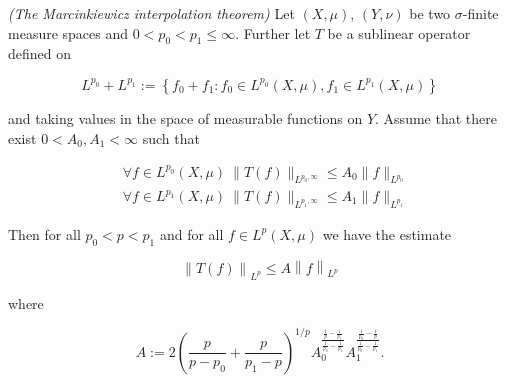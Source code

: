 \begin{mdframed}
	\begin{theorem}\emph{(The Marcinkiewicz interpolation theorem)}
		Let $(X,\mu)$, $(Y,\nu)$ be two $\sigma$-finite measure spaces and $0 < p_0 < p_1 \leq \infty$. Further let $T$ be a sublinear operator defined on
		
		\begin{equation*}
			L^{p_0} + L^{p_1} := \left\{ f_0 + f_1 : f_0 \in L^{p_0}(X,\mu), f_1 \in L^{p_1}(X,\mu) \right\}
		\end{equation*}
		
		\noindent and taking values in the space of measurable functions on $Y$. Assume that there exist $0 < A_0,A_1 < \infty$ such that

		\begin{align}
			&\forall f \in L^{p_0}(X,\mu)~\|T(f)\|_{L^{p_0,\infty}} \leq A_0 \|f\|_{L^{p_0}}\label{hyp:fp_0}\\
			&\forall f \in L^{p_1}(X,\mu)~\|T(f)\|_{L^{p_1,\infty}} \leq A_1 \|f\|_{L^{p_1}}\label{hyp:fp_1}
		\end{align}

		Then for all $p_0 < p < p_1$ and for all $f \in L^p(X,\mu)$ we have the estimate

		\begin{equation}
			\left\|T(f)\right\|_{L^p} \leq A \left\|f\right\|_{L^p}
		\end{equation}

		\noindent where

		\begin{equation}
			A := 2\left( \frac{p}{p - p_0} + \frac{p}{p_1 - p} \right)^{1/p}A_0^{\frac{\frac{1}{p} - \frac{1}{p_1}}{\frac{1}{p_0}-\frac{1}{p_1}}}A_1^{\frac{\frac{1}{p_0}-\frac{1}{p}}{\frac{1}{p_0}-\frac{1}{p_1}}}
			\label{eq:constant}.
		\end{equation}
	\end{theorem}
\end{mdframed}

